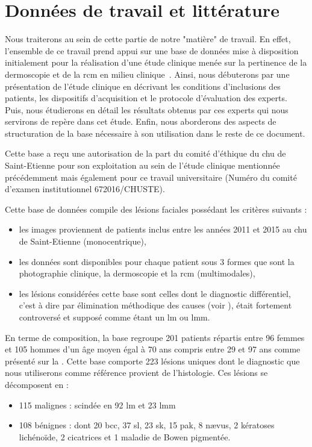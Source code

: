 
\chapter{Données de travail et littérature}
\label{chap:chapter_31}
\chapterintro

Nous traiterons au sein de cette partie de notre "matière" de travail. En effet, l'ensemble de ce travail prend appui sur une base de données mise à disposition initialement pour la réalisation d'une étude clinique menée sur la pertinence de la dermoscopie et de la \gls{rcm} en milieu clinique~\cite{Cinotti2018}. Ainsi, nous débuterons par une présentation de l'étude clinique en décrivant les conditions d'inclusions des patients, les dispositifs d'acquisition et le protocole d'évaluation des experts. Puis, nous étudierons en détail les résultats obtenus par ces experts qui nous servirons de repère dans cet étude. Enfin, nous aborderons des aspects de structuration de la base nécessaire à son utilisation dans le reste de ce document.\par

Cette base a reçu une autorisation de la part du comité d'éthique du \gls{chu} de Saint-Etienne pour son exploitation au sein de l'étude clinique mentionnée précédemment mais également pour ce travail universitaire (Numéro du comité d'examen institutionnel 672016/CHUSTE).\par

Cette base de données compile des lésions faciales possédant les critères suivants :
\begin{itemize}
\item les images proviennent de patients inclus entre les années 2011 et 2015 au \gls{chu} de Saint-Etienne (monocentrique),
\item les données sont disponibles pour chaque patient sous 3 formes que sont la photographie clinique, la dermoscopie et la \gls{rcm} (multimodales),
\item les lésions considérées cette base sont celles dont le diagnostic différentiel, c'est à dire par élimination méthodique des causes (voir
), était fortement controversé et supposé comme étant un \gls{lm} ou \gls{lmm}.
\end{itemize}\par

En terme de composition, la base regroupe 201 patients répartis entre 96 femmes et 105 hommes d'un âge moyen égal à 70 ans compris entre 29 et 97 ans comme présenté sur la . Cette base comporte 223 lésions uniques dont le diagnostic que nous utiliserons comme référence provient de l'histologie. Ces lésions se décomposent en :
\begin{itemize}
\item 115 malignes : scindée en 92 \gls{lm} et 23 \gls{lmm}
\item 108 bénignes : dont 20 \gls{bcc}, 37 \gls{sl}, 23 \gls{sk}, 15 \gls{pak}, 8 nævus, 2 kératoses lichénoïde, 2 cicatrices et 1 maladie de Bowen pigmentée.
\end{itemize}\par

